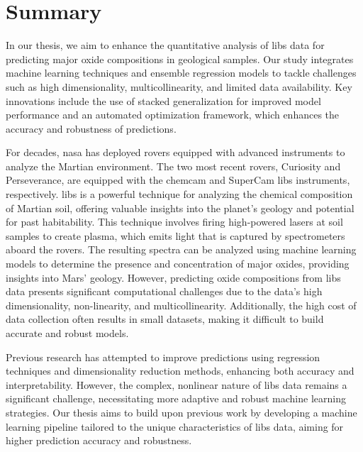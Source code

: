 \section*{Summary}
In our thesis, we aim to enhance the quantitative analysis of \gls{libs} data for predicting major oxide compositions in geological samples.
Our study integrates machine learning techniques and ensemble regression models to tackle challenges such as high dimensionality, multicollinearity, and limited data availability.
Key innovations include the use of stacked generalization for improved model performance and an automated optimization framework, which enhances the accuracy and robustness of predictions.

\vspace{0.5em}

For decades, \gls{nasa} has deployed rovers equipped with advanced instruments to analyze the Martian environment.
The two most recent rovers, Curiosity and Perseverance, are equipped with the \gls{chemcam} and SuperCam \gls{libs} instruments, respectively.
\gls{libs} is a powerful technique for analyzing the chemical composition of Martian soil, offering valuable insights into the planet's geology and potential for past habitability.
This technique involves firing high-powered lasers at soil samples to create plasma, which emits light that is captured by spectrometers aboard the rovers.
The resulting spectra can be analyzed using machine learning models to determine the presence and concentration of major oxides, providing insights into Mars' geology.
However, predicting oxide compositions from \gls{libs} data presents significant computational challenges due to the data's high dimensionality, non-linearity, and multicollinearity.
Additionally, the high cost of data collection often results in small datasets, making it difficult to build accurate and robust models.

\vspace{0.5em}

Previous research has attempted to improve predictions using regression techniques and dimensionality reduction methods, enhancing both accuracy and interpretability.
However, the complex, nonlinear nature of \gls{libs} data remains a significant challenge, necessitating more adaptive and robust machine learning strategies.
Our thesis aims to build upon previous work by developing a machine learning pipeline tailored to the unique characteristics of \gls{libs} data, aiming for higher prediction accuracy and robustness.

